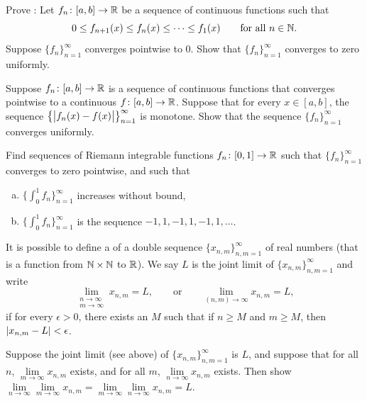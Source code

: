 \begin{exercise}[Hard] \label{exercise:dinisthm}
Prove \emph{}:
Let $f_n \colon [a,b] \to {\mathbb{R}}$ be a sequence of continuous functions such that
\begin{equation*}
0 \leq f_{n+1}(x) \leq f_n(x) \leq \cdots \leq f_1(x) 
\qquad \text{for all } n \in {\mathbb{N}}.
\end{equation*}
Suppose $\{ f_n \}_{n=1}^\infty$ converges pointwise to $0$.
Show that $\{ f_n \}_{n=1}^\infty$ converges to zero uniformly.
\end{exercise}

\begin{exercise}
Suppose $f_n \colon [a,b] \to {\mathbb{R}}$ is a sequence of continuous
functions that
converges pointwise
to a continuous $f \colon [a,b] \to {\mathbb{R}}$.  Suppose that
for every $x \in [a,b]$,
the sequence $\bigl\{ \bigl\lvert {f_n(x)-f(x)} \bigr\rvert \bigr\}_{n=1}^\infty$ is monotone.
Show that the sequence $\{f_n\}_{n=1}^\infty$ converges uniformly.
\end{exercise}

\begin{exercise}
\pagebreak[3]
Find sequences of Riemann integrable functions $f_n \colon [0,1] \to {\mathbb{R}}$ such
that $\{ f_n \}_{n=1}^\infty$ converges to zero pointwise, and such that
\begin{enumerate}[a)]
\item
$\bigl\{ \int_0^1 f_n \bigr\}_{n=1}^\infty$ increases without bound,
\item
$\bigl\{ \int_0^1 f_n \bigr\}_{n=1}^\infty$ is the sequence $-1,1,-1,1,-1,1, \ldots$.
\end{enumerate}
\end{exercise}

\begin{exnote}
It is possible to define a 
\emph{} of a double sequence
$\{ x_{n,m} \}_{n,m=1}^\infty$ of real
numbers (that is a function from ${\mathbb{N}} \times {\mathbb{N}}$ to ${\mathbb{R}}$).
We say $L$ is the joint limit of $\{ x_{n,m} \}_{n,m=1}^\infty$ and write
\begin{equation*}
\lim_{\substack{n\to\infty\\m\to\infty}}
x_{n,m} = L ,
\qquad
\text{or}
\qquad
\lim_{(n,m) \to \infty}
x_{n,m} = L ,
\end{equation*}
if for every $\epsilon > 0$, there
exists an $M$ such that if $n \geq M$ and $m \geq M$, then
$\lvert {x_{n,m} - L} \rvert < \epsilon$.
\end{exnote}

\begin{exercise}
Suppose the joint limit (see above) of $\{ x_{n,m} \}_{n,m=1}^\infty$ is $L$, and suppose
that for all $n$, $\lim\limits_{m \to \infty} x_{n,m}$ exists,
and for all $m$, $\lim\limits_{n \to \infty} x_{n,m}$ exists.  Then show
$\lim\limits_{n\to\infty}\lim\limits_{m \to \infty} x_{n,m}
=
\lim\limits_{m\to\infty}\lim\limits_{n \to \infty} x_{n,m} = L$.
\end{exercise}

